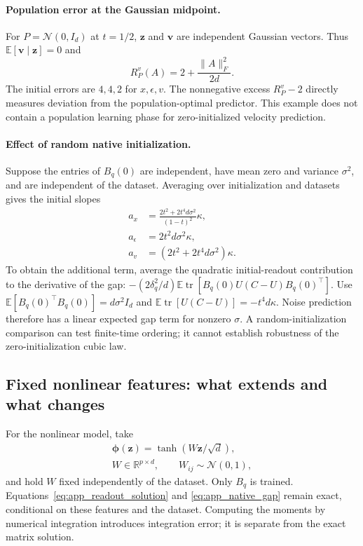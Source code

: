 \paragraph{Population error at the Gaussian midpoint.}
For $P=\mathcal N(0,I_d)$ at $t=1/2$, $\mathbf z$ and $\mathbf v$ are
independent Gaussian vectors.
Thus $\mathbb E[\mathbf v\mid\mathbf z]=0$ and
\begin{equation}
 R^v_P(A)=2+\frac{\|A\|_F^2}{2d}.
 \label{eq:app_midpoint_population}
\end{equation}
The initial errors are $4,4,2$ for $x,\epsilon,v$.
The nonnegative excess $R^v_P-2$ directly measures deviation from the
population-optimal predictor. This example does not contain a population
learning phase for zero-initialized velocity prediction.

\paragraph{Effect of random native initialization.}
Suppose the entries of $B_q(0)$ are independent, have mean zero and variance
$\sigma^2$, and are independent of the dataset. Averaging over initialization
and datasets gives the initial slopes
\begin{align}
 a_x&=\frac{2t^2+2t^4d\sigma^2}{(1-t)^2}\kappa,\\
 a_\epsilon&=2t^2d\sigma^2\kappa,\\
 a_v&=(2t^2+2t^4d\sigma^2)\kappa.
 \label{eq:app_random_initialization_slopes}
\end{align}
To obtain the additional term, average the quadratic initial-readout
contribution to the derivative of the gap:
$-(2\delta_q^2/d)\mathbb E\operatorname{tr}
[B_q(0)U(C-U)B_q(0)^\top]$.
Use $\mathbb E[B_q(0)^\top B_q(0)]=d\sigma^2I_d$ and
$\mathbb E\operatorname{tr}[U(C-U)]=-t^4d\kappa$.
Noise prediction therefore has a linear expected gap term for nonzero
$\sigma$. A random-initialization comparison can test finite-time ordering;
it cannot establish robustness of the zero-initialization cubic law.

\subsection{Fixed nonlinear features: what extends and what changes}
For the nonlinear model, take
\begin{gather*}
 \boldsymbol\phi(\mathbf z)=\tanh(W\mathbf z/\sqrt d),
 \\ W\in\mathbb R^{p\times d},\qquad W_{ij}\sim\mathcal N(0,1),
\end{gather*}
and hold $W$ fixed independently of the dataset. Only $B_q$ is trained.
Equations~\eqref{eq:app_readout_solution} and
\eqref{eq:app_native_gap} remain exact, conditional on these features and
the dataset. Computing the moments by numerical integration introduces
integration error; it is separate from the exact matrix solution.

